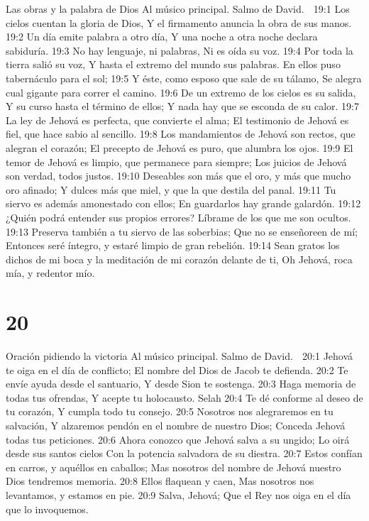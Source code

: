 Las obras y la palabra de Dios 
Al músico principal. Salmo de David. 

19:1 Los cielos cuentan la gloria de Dios, 
Y el firmamento anuncia la obra de sus manos. 
19:2 Un día emite palabra a otro día, 
Y una noche a otra noche declara sabiduría. 
19:3 No hay lenguaje, ni palabras, 
Ni es oída su voz. 
19:4 Por toda la tierra salió su voz, 
Y hasta el extremo del mundo sus palabras. 
En ellos puso tabernáculo para el sol; 
19:5 Y éste, como esposo que sale de su tálamo, 
Se alegra cual gigante para correr el camino. 
19:6 De un extremo de los cielos es su salida, 
Y su curso hasta el término de ellos; 
Y nada hay que se esconda de su calor. 
19:7 La ley de Jehová es perfecta, que convierte el alma; 
El testimonio de Jehová es fiel, que hace sabio al sencillo. 
19:8 Los mandamientos de Jehová son rectos, que alegran el corazón; 
El precepto de Jehová es puro, que alumbra los ojos. 
19:9 El temor de Jehová es limpio, que permanece para siempre; 
Los juicios de Jehová son verdad, todos justos. 
19:10 Deseables son más que el oro, y más que mucho oro afinado; 
Y dulces más que miel, y que la que destila del panal. 
19:11 Tu siervo es además amonestado con ellos; 
En guardarlos hay grande galardón. 
19:12 ¿Quién podrá entender sus propios errores? 
Líbrame de los que me son ocultos. 
19:13 Preserva también a tu siervo de las soberbias; 
Que no se enseñoreen de mí; 
Entonces seré íntegro, y estaré limpio de gran rebelión. 
19:14 Sean gratos los dichos de mi boca y la meditación de mi corazón delante de ti, 
Oh Jehová, roca mía, y redentor mío. 

\chapter{20}

Oración pidiendo la victoria 
Al músico principal. Salmo de David. 

20:1 Jehová te oiga en el día de conflicto; 
El nombre del Dios de Jacob te defienda. 
20:2 Te envíe ayuda desde el santuario, 
Y desde Sion te sostenga. 
20:3 Haga memoria de todas tus ofrendas, 
Y acepte tu holocausto. Selah 
20:4 Te dé conforme al deseo de tu corazón, 
Y cumpla todo tu consejo. 
20:5 Nosotros nos alegraremos en tu salvación, 
Y alzaremos pendón en el nombre de nuestro Dios; 
Conceda Jehová todas tus peticiones. 
20:6 Ahora conozco que Jehová salva a su ungido; 
Lo oirá desde sus santos cielos 
Con la potencia salvadora de su diestra. 
20:7 Estos confían en carros, y aquéllos en caballos; 
Mas nosotros del nombre de Jehová nuestro Dios tendremos memoria. 
20:8 Ellos flaquean y caen, 
Mas nosotros nos levantamos, y estamos en pie. 
20:9 Salva, Jehová; 
Que el Rey nos oiga en el día que lo invoquemos. 

